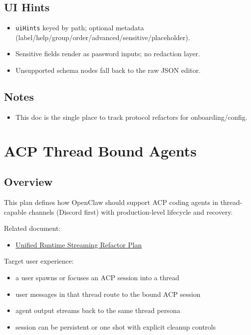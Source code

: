 \subsection{UI Hints}


\begin{itemize}
  \item \texttt{uiHints} keyed by path; optional metadata (label/help/group/order/advanced/sensitive/placeholder).
  \item Sensitive fields render as password inputs; no redaction layer.
  \item Unsupported schema nodes fall back to the raw JSON editor.
\end{itemize}


\subsection{Notes}


\begin{itemize}
  \item This doc is the single place to track protocol refactors for onboarding/config.
\end{itemize}



\clearpage

\section{ACP Thread Bound Agents}


\subsection{Overview}


This plan defines how OpenClaw should support ACP coding agents in thread-capable channels (Discord first) with production-level lifecycle and recovery.

Related document:

\begin{itemize}
  \item \href{/experiments/plans/acp-unified-streaming-refactor}{Unified Runtime Streaming Refactor Plan}
\end{itemize}


Target user experience:

\begin{itemize}
  \item a user spawns or focuses an ACP session into a thread
  \item user messages in that thread route to the bound ACP session
  \item agent output streams back to the same thread persona
  \item session can be persistent or one shot with explicit cleanup controls
\end{itemize}


